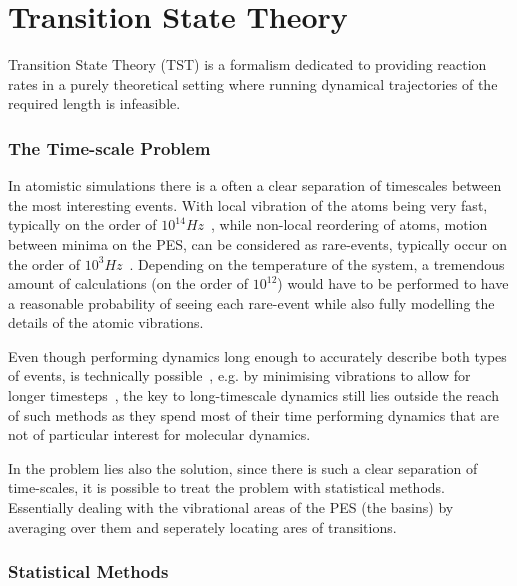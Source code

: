 \section{Transition State Theory}
\label{sec:tst}

Transition State Theory (TST) is a formalism dedicated to providing reaction rates in a purely theoretical setting where running dynamical trajectories of the required length is infeasible.

\recent

\incomplete

\subsubsection{The Time-scale Problem}
In atomistic simulations there is a often a clear separation of timescales between the most interesting events.
With local vibration of the atoms being very fast, typically on the order of $10^14 \unit{Hz}$~\citemiss,
while non-local reordering of atoms, motion between minima on the PES, can be considered as rare-events, typically occur on the order of $10^3 \unit{Hz}$~\citemiss.
Depending on the temperature of the system, a tremendous amount of calculations (on the order of $10^12$) would have to be performed to have a reasonable probability of seeing each rare-event while also fully modelling the details of the atomic vibrations.

Even though performing dynamics long enough to accurately describe both types of events, is technically possible~\citemiss, e.g. by minimising vibrations to allow for longer timesteps~\citemiss, the key to long-timescale dynamics still lies outside the reach of such methods as they spend most of their time performing dynamics that are not of particular interest for molecular dynamics.

In the problem lies also the solution, since there is such a clear separation of time-scales, it is possible to treat the problem with statistical methods.
Essentially dealing with the vibrational areas of the PES (the basins) by averaging over them and seperately locating ares of transitions.

\subsubsection{Statistical Methods}

